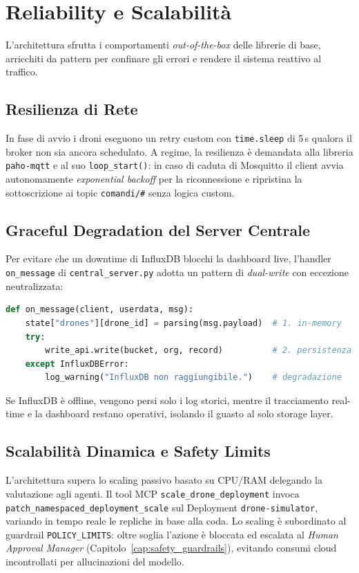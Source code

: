 
\chapter{Reliability e Scalabilità}
\label{cap:reliability_scalability}

L'architettura sfrutta i comportamenti \emph{out-of-the-box} delle librerie di base, arricchiti da pattern per confinare gli errori e rendere il sistema reattivo al traffico.

\section{Resilienza di Rete}
\label{sec:resilienza_rete}

In fase di avvio i droni eseguono un retry custom con \texttt{time.sleep} di 5\,s qualora il broker non sia ancora schedulato. A regime, la resilienza è demandata alla libreria \texttt{paho-mqtt} e al suo \texttt{loop\_start()}: in caso di caduta di Mosquitto il client avvia autonomamente \textit{exponential backoff} per la riconnessione e ripristina la sottoscrizione ai topic \texttt{comandi/\#} senza logica custom.

\section{Graceful Degradation del Server Centrale}
\label{sec:graceful_degradation}

Per evitare che un downtime di InfluxDB blocchi la dashboard live, l'handler \texttt{on\_message} di \texttt{central\_server.py} adotta un pattern di \textit{dual-write} con eccezione neutralizzata:

\begin{lstlisting}[language=Python, caption={Pattern di Graceful Degradation.}, label={lst:graceful_degradation}]
def on_message(client, userdata, msg):
    state["drones"][drone_id] = parsing(msg.payload)  # 1. in-memory
    try:
        write_api.write(bucket, org, record)          # 2. persistenza
    except InfluxDBError:
        log_warning("InfluxDB non raggiungibile.")    # degradazione
\end{lstlisting}

Se InfluxDB è offline, vengono persi solo i log storici, mentre il tracciamento real-time e la dashboard restano operativi, isolando il guasto al solo storage layer.

\section{Scalabilità Dinamica e Safety Limits}
\label{sec:scalabilita_dinamica}

L'architettura supera lo scaling passivo basato su CPU/RAM delegando la valutazione agli agenti. Il tool MCP \texttt{scale\_drone\_deployment} invoca \texttt{patch\_namespaced\_deployment\_scale} sul Deployment \texttt{drone-simulator}, variando in tempo reale le repliche in base alla coda. Lo scaling è subordinato al guardrail \texttt{POLICY\_LIMITS}: oltre soglia l'azione è bloccata ed escalata al \textit{Human Approval Manager} (Capitolo~\ref{cap:safety_guardrails}), evitando consumi cloud incontrollati per allucinazioni del modello.
